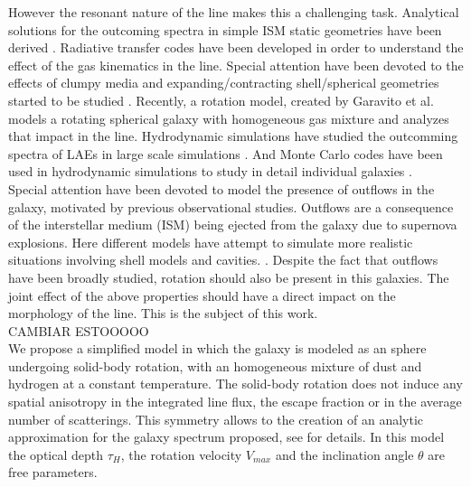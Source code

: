 \documentclass{latex/emulateapj}
\begin{document}
However the resonant nature of the line makes this a challenging task. Analytical solutions for the outcoming spectra in simple ISM static geometries have been derived \cite{Adams72, Harrington73, Neufeld90, Dijkstra06}. Radiative transfer codes \citep{DijkstraKramer, Laursen09, Verhamme06, CLARA} have been developed in order to understand the effect of the gas kinematics in the \lya line. Special attention have been devoted to  the effects of clumpy media \citep{Hansen06} and expanding/contracting shell/spherical geometries started to be studied \citep{Ahn03,Verhamme06,Dijkstra06}. Recently, a rotation model, created by Garavito et al. \cite{Garavito14} models
a rotating spherical galaxy with homogeneous gas mixture and analyzes that impact in the \lya line. Hydrodynamic simulations have studied the outcomming spectra of LAEs in large scale simulations \cite{Forero12}. And Monte Carlo codes have been used in hydrodynamic simulations to study in detail individual galaxies \citep{Laursen09,Barnes11,Verhamme12,Yajima12}.\\

Special attention have been devoted to model the presence of outflows in the galaxy, motivated by previous observational studies. Outflows are a consequence of the interstellar medium (ISM) being ejected from the galaxy due to supernova explosions. Here different models have attempt to simulate more realistic situations involving shell models and cavities. \citep{Behrens2014}. Despite the fact that outflows have been broadly studied, rotation should also be present in this galaxies. The joint effect of the above properties should have a direct impact on the morphology of the \lya line. This is the subject of this work. \\

CAMBIAR ESTOOOOO\\

We propose a simplified model in which the galaxy is modeled as an sphere undergoing solid-body rotation, with an homogeneous mixture of dust and hydrogen at a constant temperature. The solid-body rotation does not induce any spatial anisotropy in the integrated line flux, the escape fraction or in the average number of scatterings. This symmetry allows to the creation of an analytic approximation for the galaxy spectrum  proposed, see \cite{Garavito14} for details. In this model the optical depth $\tau_{H}$, the  rotation velocity $V_{max}$ and the inclination angle $\theta$ are free parameters. \\
 
\end{document}
